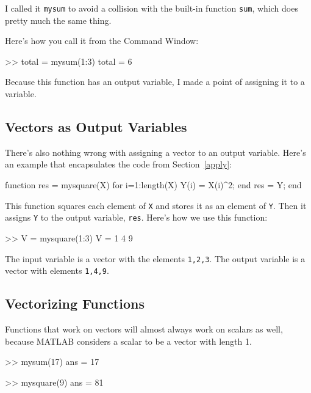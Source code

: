 I called it {\tt mysum} to avoid a collision with the built-in
function {\tt sum}, which does pretty much the same thing.


Here's how you call it from the Command Window:

\begin{code}
>> total = mysum(1:3)
total = 6
\end{code}

Because this function has an output variable, I made a
point of assigning it to a variable.



\subsection{Vectors as Output Variables}

There's also nothing wrong with assigning a vector to an output
variable. Here's an example that encapsulates the code from
Section~\ref{apply}:

\begin{code}
function res = mysquare(X)
    for i=1:length(X)
        Y(i) = X(i)^2;
    end
    res = Y;
end
\end{code}

This function squares each element of {\tt X} and stores it as an element of {\tt Y}.  Then it assigns {\tt Y} to the output variable, {\tt res}.  Here's how we use this function:

\begin{code}
>> V = mysquare(1:3)
V = 1     4     9
\end{code}

The input variable is a vector with the elements {\tt 1,2,3}.  The output variable is a vector with elements {\tt 1,4,9}.




\subsection{Vectorizing Functions}

Functions that work on vectors will almost always work on scalars
as well, because MATLAB considers a scalar to be a vector with
length 1.


\begin{code}
>> mysum(17)
ans = 17

>> mysquare(9)
ans = 81
\end{code}

